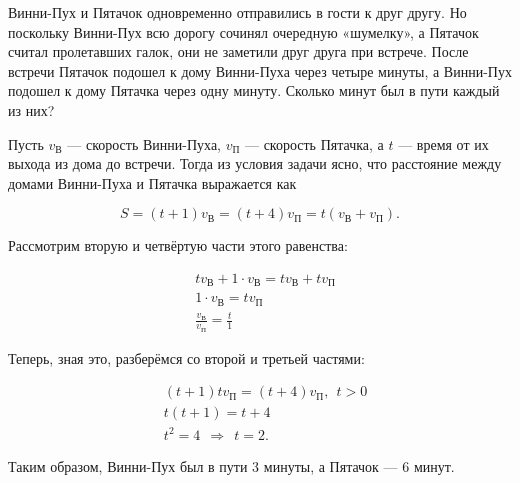 \begin{itemize}

\itB Винни-Пух и Пятачок одновременно отправились в гости к друг другу. Но поскольку Винни-Пух всю дорогу сочинял очередную «шумелку», а Пятачок считал пролетавших галок, они не заметили друг друга при встрече. После встречи Пятачок подошел к дому Винни-Пуха через четыре минуты, а Винни-Пух подошел к дому Пятачка через одну минуту. Сколько минут был в пути каждый из них?

\def\vv{v_\text{В}} \def\vp{v_\text{П}}
\itr Пусть $\vv$ — скорость Винни-Пуха, $\vp$ — скорость Пятачка, а $t$ — время от их выхода из дома до встречи. Тогда из условия задачи ясно, что расстояние между домами Винни-Пуха и Пятачка выражается как

\vspace{-0.4cm}
$$S = (t+1)\vv = (t+4)\vp = t(\vv+\vp).$$

Рассмотрим вторую и четвёртую части этого равенства:

\begin{align*}
	& t\vv + 1 \cdot \vv = t\vv + t\vp \\
	& 1 \cdot \vv = t \vp \\
	& \frac{\vv}{\vp} = \frac{t}{1}
\end{align*}

Теперь, зная это, разберёмся со второй и третьей частями:

\begin{align*}
	& (t+1)t\vp = (t+4)\vp,\ \ t>0 \\
	& t(t+1) = t+4 \\
	& t^2 = 4\ \ \Longrightarrow\ \ t=2.
\end{align*}


Таким образом, Винни-Пух был в пути 3 минуты, а Пятачок — 6 минут.
\end{itemize}

